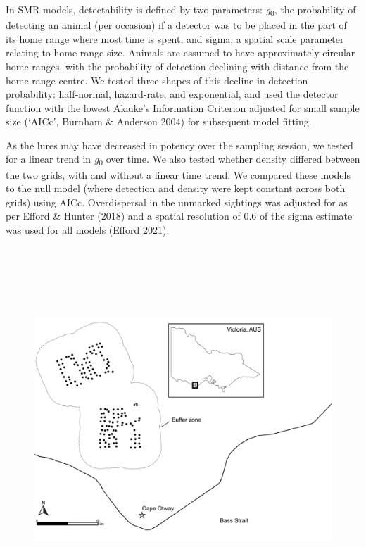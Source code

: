 \documentclass[11pt,a4paper,titlepage,twoside,openright]{style/unimelbthesis}
\begin{document}
\begin{mainmatter}
In SMR models, detectability is defined by two parameters: \emph{g}\textsubscript{0}, the probability of detecting an animal (per occasion) if a detector was to be placed in the part of its home range where most time is spent, and sigma, a spatial scale parameter relating to home range size. Animals are assumed to have approximately circular home ranges, with the probability of detection declining with distance from the home range centre. We tested three shapes of this decline in detection probability: half‐normal, hazard‐rate, and exponential, and used the detector function with the lowest Akaike's Information Criterion adjusted for small sample size (`AICc', Burnham \& Anderson 2004) for subsequent model fitting.

As the lures may have decreased in potency over the sampling session, we tested for a linear trend in \emph{g}\textsubscript{0} over time. We also tested whether density differed between the two grids, with and without a linear time trend. We compared these models to the null model (where detection and density were kept constant across both grids) using AICc. Overdispersal in the unmarked sightings was adjusted for as per Efford \& Hunter (2018) and a spatial resolution of 0.6 of the sigma estimate was used for all models (Efford 2021).

\newpage

\(~\)

\(~\)

\(~\)
\begin{figure}

\hfill{}\includegraphics[width=1\linewidth]{figure/otways17_map} 


\end{figure}
\end{mainmatter}
\end{document}
